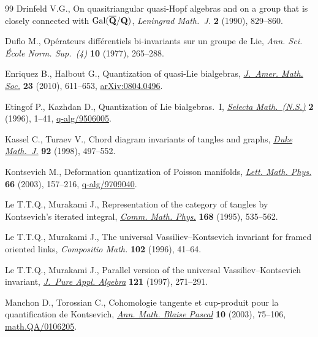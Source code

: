 \documentclass[pdftex]{sigma}
\numberwithin{equation}{section}
\theoremstyle{definition}
\begin{document}
\begin{thebibliography}{99}
Drinfeld V.G., On quasitriangular quasi-{H}opf algebras and on a group that is
 closely connected with {${\rm Gal}(\overline{\bf Q}/{\bf Q})$},
 \textit{Leningrad Math.~J.} \textbf{2} (1990), 829--860.

Duf\/lo M., Op\'erateurs dif\/f\'erentiels bi-invariants sur un groupe de {L}ie,
 \textit{Ann. Sci. \'Ecole Norm. Sup.~(4)} \textbf{10} (1977), 265--288.

Enriquez B., Halbout G., Quantization of quasi-{L}ie bialgebras,
 \href{http://dx.doi.org/10.1090/S0894-0347-10-00654-5}{\textit{J.~Amer. Math. Soc.}} \textbf{23} (2010), 611--653,
 \href{http://arxiv.org/abs/0804.0496}{arXiv:0804.0496}.

Etingof P., Kazhdan D., Quantization of {L}ie bialgebras.~{I}, \href{http://dx.doi.org/10.1007/BF01587938}{\textit{Selecta
 Math.~(N.S.)}} \textbf{2} (1996), 1--41, \mbox{\href{http://arxiv.org/abs/q-alg/9506005}{q-alg/9506005}}.

Kassel C., Turaev V., Chord diagram invariants of tangles and graphs,
 \href{http://dx.doi.org/10.1215/S0012-7094-98-09215-8}{\textit{Duke Math.~J.}} \textbf{92} (1998), 497--552.

Kontsevich M., Deformation quantization of {P}oisson manifolds, \href{http://dx.doi.org/10.1023/B:MATH.0000027508.00421.bf}{\textit{Lett.
 Math. Phys.}} \textbf{66} (2003), 157--216, \mbox{\href{http://arxiv.org/abs/q-alg/9709040}{q-alg/9709040}}.

Le T.T.Q., Murakami J., Representation of the category of tangles by
 {K}ontsevich's iterated integral, \href{http://dx.doi.org/10.1007/BF02101842}{\textit{Comm. Math. Phys.}} \textbf{168}
 (1995), 535--562.

Le T.T.Q., Murakami J., The universal {V}assiliev--{K}ontsevich invariant for
 framed oriented links, \textit{Compositio Math.} \textbf{102} (1996), 41--64.

Le T.T.Q., Murakami J., Parallel version of the universal
 {V}assiliev--{K}ontsevich invariant, \href{http://dx.doi.org/10.1016/S0022-4049(96)00054-0}{\textit{J.~Pure Appl. Algebra}}
 \textbf{121} (1997), 271--291.

Manchon D., Torossian C., Cohomologie tangente et cup-produit pour la
 quantif\/ication de {K}ontsevich, \href{http://dx.doi.org/10.5802/ambp.168}{\textit{Ann. Math. Blaise Pascal}} \textbf{10}
 (2003), 75--106, \href{http://arxiv.org/abs/math.QA/0106205}{math.QA/0106205}.


\end{thebibliography}
\end{document}
